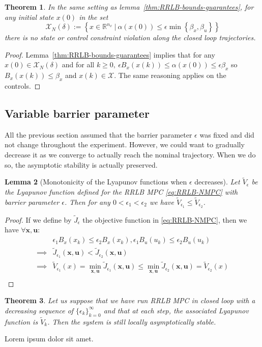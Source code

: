 \documentclass[conference]{IEEEtran}
\newtheorem{theorem}{Theorem}[section]
\newtheorem{lemma}[theorem]{Lemma}
\theoremstyle{definition}
\theoremstyle{remark}
\def\cal#1{\mathcal{#1}}
\def\bf#1{\mathbf{#1}}
\newcommand{\R}{\mathbb{R}}
\begin{document}
\begin{theorem}
	In the same setting as lemma~\ref{thm:RRLB-bounds-guarantees}, for any initial state $x(0)$ in the set
	$$\cal{X}_N(\delta):=\left\{x\in\R^{n_x}~|~\alpha(x(0))\leq\epsilon\min\left\{\beta_x,\beta_u\right\}\right\}$$
	there is no state or control constraint violation along the closed loop trajectories.
\end{theorem}

\begin{proof}
	Lemma~\ref{thm:RRLB-bounds-guarantees} implies that for any $x(0)\in\cal{X}_N(\delta)$ and for all $k\geq 0,~\epsilon B_x(x(k))\leq\alpha(x(0))\leq\epsilon\beta_x$ so $B_x(x(k))\leq \beta_x$ and $x(k)\in\cal{X}$.
	The same reasoning applies on the controls.
\end{proof}

\subsection{Variable barrier parameter}
All the previous section assumed that the barrier parameter $\epsilon$ was fixed and did not change throughout the experiment.
However, we could want to gradually decrease it as we converge to actually reach the nominal trajectory.
When we do so, the asymptotic stability is actually preserved.

\begin{lemma}[Monotonicity of the Lyapunov functions when $\epsilon$ decreases]
	Let $\tilde{V}_{\epsilon}$ be the Lyapunov function defined for the RRLB MPC \eqref{eq:RRLB-NMPC} with barrier parameter $\epsilon$.
	Then for any $0<\epsilon_1<\epsilon_2$ we have $\tilde{V}_{\epsilon_1}\leq\tilde{V}_{\epsilon_2}$.
\end{lemma}

\begin{proof}
	If we define by $\tilde{J}_{\epsilon}$ the objective function in \eqref{eq:RRLB-NMPC}, then we have $\forall \bf{x},\bf{u}$:
	\begin{align*}
		&\epsilon_1B_x(x_k)\leq \epsilon_2B_x(x_k),\epsilon_1B_u(u_k)\leq \epsilon_2B_u(u_k)\\
		\implies&\tilde{J}_{\epsilon_1}(\bf{x},\bf{u})<\tilde{J}_{\epsilon_2}(\bf{x},\bf{u})\\
		\implies&\tilde{V}_{\epsilon_1}(x)=\min_{\bf{x},\bf{u}}\tilde{J}_{\epsilon_1}(\bf{x},\bf{u})\leq\min_{\bf{x},\bf{u}}\tilde{J}_{\epsilon_2}(\bf{x},\bf{u}) = \tilde{V}_{\epsilon_2}(x)\\
	\end{align*}
\end{proof}

\begin{theorem}
	Let us suppose that we have run RRLB MPC in closed loop with a decreasing sequence of $\{\epsilon_k\}_{k=0}^\infty$ and that at each step, the associated Lyapunov function is $\tilde{V}_{k}$.
	Then the system is still locally asymptotically stable.
\end{theorem}


\appendix
Lorem ipsum dolor sit amet.

\printbibliography

\end{document}
